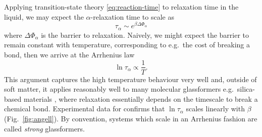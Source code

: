 \documentclass[11pt,twoside]{report}
\begin{document}
Applying transition-state theory \eqref{eq:reaction-time} to relaxation time in the liquid, we may expect the $\alpha$-relaxation time to scale as
\begin{equation}\label{eq:tau-barrier}
  \tau_\alpha \sim e^{\beta \Delta \Phi_\alpha}
\end{equation}
where $\Delta \Phi_\alpha$ is the barrier to relaxation.
Naively, we might expect the barrier to remain constant with temperature, corresponding to e.g.\ the cost of breaking a bond, then we arrive at the Arrhenius law
\begin{equation}\label{eq:arrhenius-law}
  \ln{\tau_\alpha} \propto \frac{1}{T}.
\end{equation}
This argument captures the high temperature behaviour very well and, outside of soft matter, it applies reasonably well to many molecular glassformers e.g.\ silica-based materials%
,
where relaxation essentially depends on the timescale to break a chemical bond.
Experimental data for  \cite{AngellS1995} confirms that $\ln{\tau_\alpha}$ scales linearly with $\beta$ (Fig.\ \ref{fig:angell}).
By convention, systems which scale in an Arrhenius fashion are called \emph{strong}%
glassformers.
\end{document}
